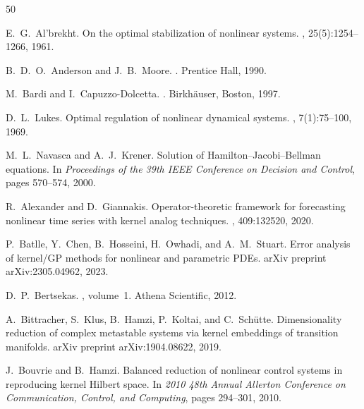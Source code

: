 \documentclass[11pt]{article}
\begin{document}
\begin{thebibliography}{50}

E.~G.~Al'brekht.
\newblock On the optimal stabilization of nonlinear systems.
, 25(5):1254--1266, 1961.

B.~D.~O.~Anderson and J.~B.~Moore.
.
\newblock Prentice Hall, 1990.

M.~Bardi and I.~Capuzzo-Dolcetta.
.
\newblock Birkh\"auser, Boston, 1997.

D.~L.~Lukes.
\newblock Optimal regulation of nonlinear dynamical systems.
, 7(1):75--100, 1969.

M.~L.~Navasca and A.~J.~Krener.
\newblock Solution of {H}amilton--{J}acobi--{B}ellman equations.
\newblock In {\em Proceedings of the 39th IEEE Conference on Decision and Control}, pages 570--574, 2000.

R.~Alexander and D.~Giannakis.
\newblock Operator-theoretic framework for forecasting nonlinear time series with kernel analog techniques.
, 409:132520, 2020.

P.~Batlle, Y.~Chen, B.~Hosseini, H.~Owhadi, and A.~M.~Stuart.
\newblock Error analysis of kernel/GP methods for nonlinear and parametric PDEs.
\newblock arXiv preprint arXiv:2305.04962, 2023.

D.~P.~Bertsekas.
, volume~1.
\newblock Athena Scientific, 2012.

A.~Bittracher, S.~Klus, B.~Hamzi, P.~Koltai, and C.~Sch\"utte.
\newblock Dimensionality reduction of complex metastable systems via kernel embeddings of transition manifolds.
\newblock arXiv preprint arXiv:1904.08622, 2019.

J.~Bouvrie and B.~Hamzi.
\newblock Balanced reduction of nonlinear control systems in reproducing kernel {H}ilbert space.
\newblock In {\em 2010 48th Annual Allerton Conference on Communication, Control, and Computing}, pages 294--301, 2010.


\end{thebibliography}
\end{document}
